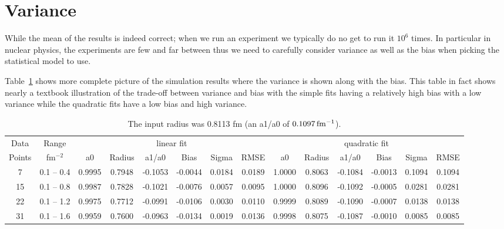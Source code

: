 \documentclass[10pt,aps,prc,twocolumn]{revtex4-1}
\begin{document}
\section{Variance}

While the mean of the results is indeed correct; when we run an experiment we typically do no get to run it $10^6$ times.
In particular in nuclear physics, the experiments are few and far between thus we need to carefully consider variance as
well as the bias when picking the statistical model to use.

Table~\ref{fulltable} shows more complete picture of the simulation results where the variance is shown along with the bias.
This table in fact shows nearly a textbook illustration of the trade-off between variance and bias with the simple fits
having a relatively high bias with a low variance while the quadratic fits have a low bias and high variance.

\begin{table}
\label{fulltable}
\caption{The input radius was 0.8113 fm (an a1/a0 of $\unit[0.1097]{fm^{-1}}$).}
\begin{tabular}{cc|cccccc|cccccc} \hline
Data   & Range     & \multicolumn{6}{c|}{linear fit}                       & \multicolumn{6}{c}{quadratic fit}                    \\ 
Points & fm$^{-2}$ &   a0  & Radius&  a1/a0 &  Bias  & Sigma &  RMSE  &   a0  & Radius& a1/a0  &  Bias  & Sigma &  RMSE \\  \hline
7      & 0.1 -- 0.4 & 0.9995& 0.7948& -0.1053& -0.0044& 0.0184& 0.0189 & 1.0000& 0.8063& -0.1084& -0.0013& 0.1094& 0.1094\\
15     & 0.1 -- 0.8 & 0.9987& 0.7828& -0.1021& -0.0076& 0.0057& 0.0095 & 1.0000& 0.8096& -0.1092& -0.0005& 0.0281& 0.0281\\
22     & 0.1 -- 1.2 & 0.9975& 0.7712& -0.0991& -0.0106& 0.0030& 0.0110 & 0.9999& 0.8089& -0.1090& -0.0007& 0.0138& 0.0138\\
31     & 0.1 -- 1.6 & 0.9959& 0.7600& -0.0963& -0.0134& 0.0019& 0.0136 & 0.9998& 0.8075& -0.1087& -0.0010& 0.0085& 0.0085\\ \hline
\end{tabular}
\end{table}
\end{document}
